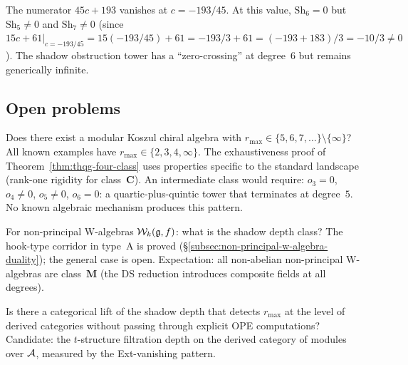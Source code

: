 \begin{computation}
The numerator $45c + 193$ vanishes at $c = -193/45$. At this
value, $\mathrm{Sh}_6 = 0$ but $\mathrm{Sh}_5 \neq 0$ and
$\mathrm{Sh}_7 \neq 0$ (since $15c + 61|_{c=-193/45} =
15(-193/45) + 61 = -193/3 + 61 = (-193 + 183)/3 = -10/3 \neq 0$).
The shadow obstruction tower has a ``zero-crossing'' at degree~$6$ but remains
generically infinite.
\end{computation}



\subsection{Open problems}
\label{subsec:thqg-open-problems}

\begin{openproblem}
\label{open:thqg-gap}
Does there exist a modular Koszul chiral algebra with
$r_{\max} \in \{5, 6, 7, \ldots\} \setminus \{\infty\}$?
All known examples have $r_{\max} \in \{2, 3, 4, \infty\}$.
The exhaustiveness proof of
Theorem~\ref{thm:thqg-four-class} uses properties specific
to the standard landscape (rank-one rigidity for
class~$\mathbf{C}$). An intermediate class would require:
$o_3 = 0$, $o_4 \neq 0$, $o_5 \neq 0$, $o_6 = 0$: a
quartic-plus-quintic tower that terminates at degree~$5$.
No known algebraic mechanism produces this pattern.
\end{openproblem}

\begin{openproblem}
\label{open:thqg-non-principal}
For non-principal W-algebras $\mathcal{W}_k(\mathfrak{g}, f)$:
what is the shadow depth class? The hook-type corridor
in type~A is proved
(\S\ref{subsec:non-principal-w-algebra-duality}); the general case
is open. Expectation: all non-abelian non-principal
W-algebras are class~$\mathbf{M}$ (the DS reduction
introduces composite fields at all degrees).
\end{openproblem}

\begin{openproblem}
\label{open:thqg-categorical}
Is there a categorical lift of the shadow depth that
detects $r_{\max}$ at the level of derived categories
without passing through explicit OPE computations?
Candidate: the $t$-structure filtration depth on the
derived category of modules over $\mathcal{A}$, measured by
the Ext-vanishing pattern.
\end{openproblem}
